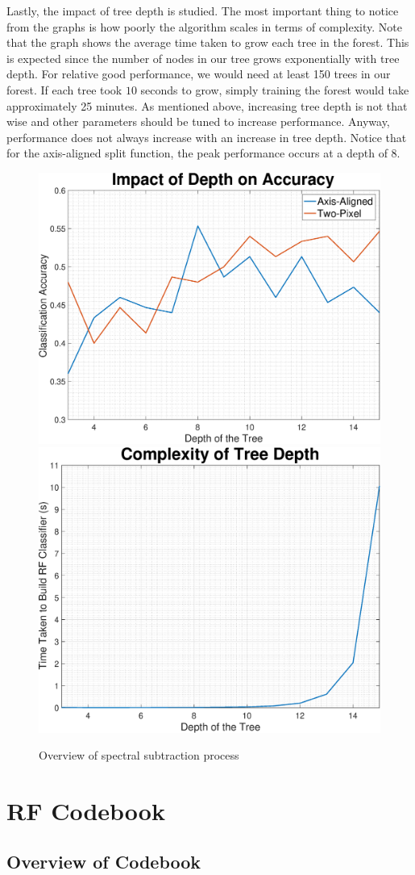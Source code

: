 \documentclass[a4paper,pra,twocolumn,10pt,aps,longbibliography,nobalancelastpage]{revtex4-1}
\begin{document}
Lastly, the impact of tree depth is studied. The most important thing to notice from the graphs is how poorly the algorithm scales in terms of complexity. Note that the graph shows the average time taken to grow each tree in the forest. This is expected since the number of nodes in our tree grows exponentially with tree depth. For relative good performance, we would need at least 150 trees in our forest. If each tree took $10$ seconds to grow, simply training the forest would take approximately 25 minutes. As mentioned above, increasing tree depth is not that wise and other parameters should be tuned to increase performance. Anyway, performance does not always increase with an increase in tree depth. Notice that for the axis-aligned split function, the peak performance occurs at a depth of 8. 

\begin{figure}[H]
	\centering
    \includegraphics[width=0.49\columnwidth]{depth_acc}
	\includegraphics[width=0.49\columnwidth]{depth_complexity}
    \caption{Overview of spectral subtraction process}
\end{figure}

\section{RF Codebook}

\subsection{Overview of Codebook}
\end{document}
